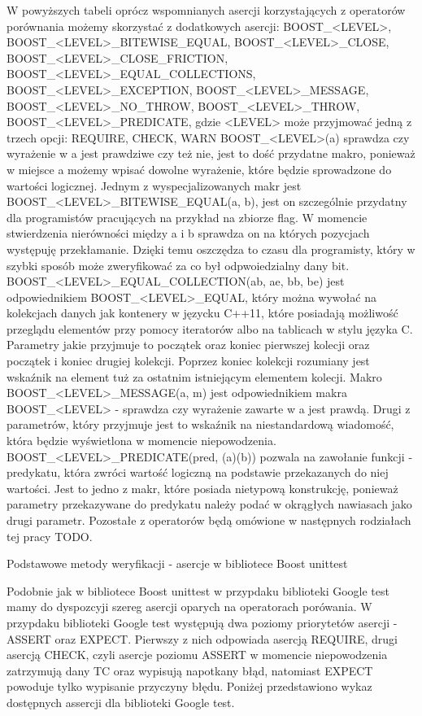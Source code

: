 \documentclass[12pt,a4paper,notitlepage]{report}
\begin{document}
W powyższych tabeli oprócz wspomnianych asercji korzystających z operatorów porównania możemy skorzystać z dodatkowych asercji: BOOST_<LEVEL>, BOOST_<LEVEL>_BITEWISE_EQUAL, BOOST_<LEVEL>_CLOSE, BOOST_<LEVEL>_CLOSE_FRICTION, BOOST_<LEVEL>_EQUAL_COLLECTIONS, BOOST_<LEVEL>_EXCEPTION, BOOST_<LEVEL>_MESSAGE, BOOST_<LEVEL>_NO_THROW, BOOST_<LEVEL>_THROW, BOOST_<LEVEL>_PREDICATE, gdzie <LEVEL> może przyjmować jedną z trzech opcji: REQUIRE, CHECK, WARN
BOOST_<LEVEL>(a) sprawdza czy wyrażenie w a jest prawdziwe czy też nie, jest to dość przydatne makro, ponieważ w miejsce a możemy wpisać dowolne wyrażenie, które będzie sprowadzone do wartości logicznej.
Jednym z wyspecjalizowanych makr jest BOOST_<LEVEL>_BITEWISE_EQUAL(a, b), jest on szczególnie przydatny dla programistów pracujących na przykład na zbiorze flag. W momencie stwierdzenia nierówności między a i b sprawdza on na których pozycjach występuję przekłamanie. Dzięki temu oszczędza to czasu dla programisty, który w szybki sposób może zweryfikować za co był odpwoiedzialny dany bit.
BOOST_<LEVEL>_EQUAL_COLLECTION(ab, ae, bb, be) jest odpowiednikiem BOOST_<LEVEL>_EQUAL, który można wywołać na kolekcjach danych jak kontenery w języcku C++11, które posiadają możliwość przeglądu elementów przy pomocy iteratorów albo na tablicach w stylu języka C. Parametry jakie przyjmuje to początek oraz koniec pierwszej kolecji oraz początek i koniec drugiej kolekcji. Poprzez koniec kolekcji rozumiany jest wskaźnik na element tuż za ostatnim istniejącym elementem kolecji.
Makro BOOST_<LEVEL>_MESSAGE(a, m) jest odpowiednikiem makra BOOST_<LEVEL> - sprawdza czy wyrażenie zawarte w a jest prawdą. Drugi z parametrów, który przyjmuje jest to wskaźnik na niestandardową wiadomość, która będzie wyświetlona w momencie niepowodzenia.
BOOST_<LEVEL>_PREDICATE(pred, (a)(b)) pozwala na zawołanie funkcji - predykatu, która zwróci wartość logiczną na podstawie przekazanych do niej wartości. Jest to jedno z makr, które posiada nietypową konstrukcję, ponieważ parametry przekazywane do predykatu należy podać w okrągłych nawiasach jako drugi parametr.
Pozostałe z operatorów będą omówione w następnych rodziałach tej pracy TODO.

Podstawowe metody weryfikacji - asercje w bibliotece Boost unittest

Podobnie jak w bibliotece Boost unittest w przypdaku biblioteki Google test mamy do dyspozcyji szereg asercji oparych na operatorach porówania. W przypdaku biblioteki Google test występują dwa poziomy priorytetów asercji - ASSERT oraz EXPECT. Pierwszy z nich odpowiada asercją REQUIRE, drugi asercją CHECK, czyli asercje poziomu ASSERT w momencie niepowodzenia zatrzymują dany TC oraz wypisują napotkany błąd, natomiast EXPECT powoduje tylko wypisanie przyczyny błędu.
Poniżej przedstawiono wykaz dostępnych assercji dla biblioteki Google test.
\end{document}
